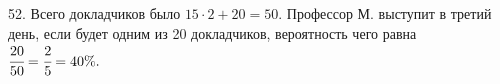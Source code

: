 52. Всего докладчиков было $15\cdot2+20=50.$ Профессор М. выступит в третий день, если будет одним из 20 докладчиков, вероятность чего равна $\cfrac{20}{50}=\cfrac{2}{5}=40\%.$\\
